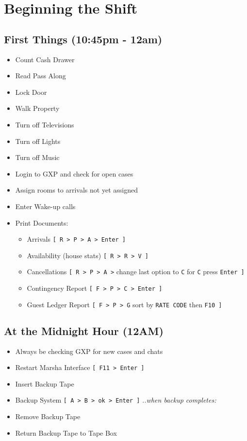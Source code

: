 \section*{Beginning the Shift}

\subsection*{First Things (10:45pm - 12am)}
\begin{itemize}
    \item Count Cash Drawer
    \item Read Pass Along
    \item Lock Door
    \item Walk Property
    \item Turn off Televisions
    \item Turn off Lights
    \item Turn off Music
    \item Login to GXP and check for open cases
    \item Assign rooms to arrivals not yet assigned
    \item Enter Wake-up calls
    \item Print Documents:
    \begin{itemize}
        \item Arrivals \verb|[ R > P > A > Enter ]|
        \item Availability (house stats) \verb|[ R > R > V ]|
        \item Cancellations \verb|[ R > P > A >| change last option to \verb|C| for \verb|C| press \verb|Enter ]|
        \item Contingency Report \verb|[ F > P > C > Enter ]|
        \item Guest Ledger Report \verb|[ F > P > G| sort by \verb|RATE CODE| then \verb|F10 ]|
    \end{itemize}
\end{itemize}

\subsection*{At the Midnight Hour (12AM)}
 \begin{itemize}
    \item Always be checking GXP for new cases and chats
    \item Restart Marsha Interface \verb|[ F11 > Enter ]|
    \item Insert Backup Tape
    \item Backup System \verb|[ A > B > ok > Enter ]|\newline
    \textit{..when backup completes:}
    \item Remove Backup Tape
    \item Return Backup Tape to Tape Box
\end{itemize}
\newpage

